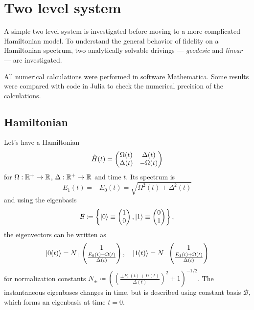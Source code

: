 \chapter{Two level system}
\label{chap:twoLevelSystem}
A simple two-level system is investigated before moving to a more complicated Hamiltonian model. To understand the general behavior of fidelity on a Hamiltonian spectrum, two analytically solvable drivings — \emph{geodesic} and \emph{linear} — are investigated.

All numerical calculations were performed in software Mathematica. Some results were compared with code in Julia to check the numerical precision of the calculations.

\section{Hamiltonian}
Let's have a Hamiltonian
\begin{equation}
    \hat{H}(t)=\begin{pmatrix}
        \Omega(t)&\Delta(t)\\
        \Delta(t)&-\Omega(t)
    \end{pmatrix}
\end{equation}
for $\Omega: \mathbb{R}^+\rightarrow \mathbb{R}$, $\Delta: \mathbb{R}^+\rightarrow \mathbb{R}$ and time $t$. Its spectrum is
\begin{equation}
    E_1(t)=-E_0(t)= \sqrt{\Omega^2(t)+\Delta^2(t)}
    \label{eq:energy}
\end{equation}
and using the eigenbasis
\begin{equation}
    \mathcal{B}\coloneqq \left\{
        \ket{0}\equiv\begin{pmatrix}
                1\\0
            \end{pmatrix},
        \ket{1}\equiv\begin{pmatrix}
            0\\1
        \end{pmatrix} \right\},
    \label{eq:eigenbasisDef}
\end{equation}
the eigenvectors  can be written as 
\begin{equation}
\ket{0(t)}=N_+ \begin{pmatrix}
    1\\ \frac{E_0(t)+\Omega(t)}{\Delta(t)}
\end{pmatrix},\quad \ket{1(t)}=N_-\begin{pmatrix}
    1\\ \frac{E_1(t)+\Omega(t)}{\Delta(t)}
   \end{pmatrix}
   \label{eq:eigenvectors}
\end{equation}
for normalization constants $N_\pm\coloneqq\left(\left(\frac{\pm E_0(t)+\Omega(t)}{\Delta(t)}\right)^2+1\right)^{-1/2}$. The instantaneous eigenbases changes in time, but is described using constant basis $\mathcal B$, which forms an eigenbasis at time $t=0$.

